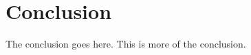 \section{Conclusion}
\label{sec:Conclusion}
The conclusion goes here. This is more of the conclusion.
